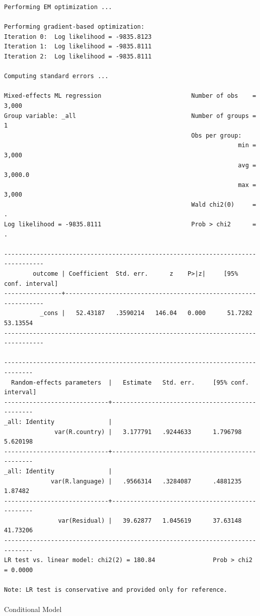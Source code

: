 \documentclass[
  letterpaper,
  DIV=11,
  numbers=noendperiod]{scrreprt}
\makeatletter
\let\oldparagraph\paragraph
\renewcommand{\paragraph}{
    \@ifstar
      \xxxParagraphStar
      \xxxParagraphNoStar
  }
\newcommand{\xxxParagraphStar}[1]{\oldparagraph*{#1}\mbox{}}
\newcommand{\xxxParagraphNoStar}[1]{\oldparagraph{#1}\mbox{}}
\makeatother
\begin{document}
\begin{verbatim}
Performing EM optimization ...

Performing gradient-based optimization: 
Iteration 0:  Log likelihood = -9835.8123  
Iteration 1:  Log likelihood = -9835.8111  
Iteration 2:  Log likelihood = -9835.8111  

Computing standard errors ...

Mixed-effects ML regression                         Number of obs    =   3,000
Group variable: _all                                Number of groups =       1
                                                    Obs per group:
                                                                 min =   3,000
                                                                 avg = 3,000.0
                                                                 max =   3,000
                                                    Wald chi2(0)     =       .
Log likelihood = -9835.8111                         Prob > chi2      =       .

---------------------------------------------------------------------------------
        outcome | Coefficient  Std. err.      z    P>|z|     [95% conf. interval]
----------------+----------------------------------------------------------------
          _cons |   52.43187   .3590214   146.04   0.000      51.7282    53.13554
---------------------------------------------------------------------------------

------------------------------------------------------------------------------
  Random-effects parameters  |   Estimate   Std. err.     [95% conf. interval]
-----------------------------+------------------------------------------------
_all: Identity               |
              var(R.country) |   3.177791   .9244633      1.796798    5.620198
-----------------------------+------------------------------------------------
_all: Identity               |
             var(R.language) |   .9566314   .3284087      .4881235     1.87482
-----------------------------+------------------------------------------------
               var(Residual) |   39.62877   1.045619      37.63148    41.73206
------------------------------------------------------------------------------
LR test vs. linear model: chi2(2) = 180.84                Prob > chi2 = 0.0000

Note: LR test is conservative and provided only for reference.
\end{verbatim}

\paragraph{Conditional Model}\label{conditional-model-3}
\end{document}
